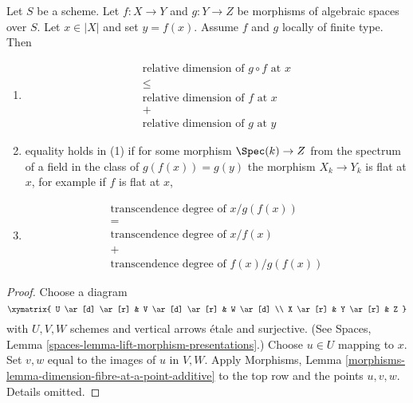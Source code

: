 \begin{lemma}
\label{lemma-dimension-fibre-at-a-point-additive}
Let $S$ be a scheme.
Let $f : X \to Y$ and $g : Y \to Z$ be morphisms of algebraic spaces over $S$.
Let $x \in |X|$ and set $y = f(x)$.
Assume $f$ and $g$ locally of finite type.
Then
\begin{enumerate}
\item
$$
\begin{matrix}
\text{relative dimension of }g \circ f\text{ at }x \\
\leq \\
\text{relative dimension of }f\text{ at }x \\
+ \\
\text{relative dimension of }g\text{ at }y
\end{matrix}
$$
\item equality holds in (1) if for some morphism $\Spec(k) \to Z$
from the spectrum of a field in the class of $g(f(x)) = g(y)$
the morphism $X_k \to Y_k$ is flat at $x$, for example if $f$ is flat at $x$,
\item
$$
\begin{matrix}
\text{transcendence degree of }x/g(f(x)) \\
= \\
\text{transcendence degree of }x/f(x) \\
+ \\
\text{transcendence degree of }f(x)/g(f(x))
\end{matrix}
$$
\end{enumerate}
\end{lemma}

\begin{proof}
Choose a diagram
$$
\xymatrix{
U \ar[d] \ar[r] & V \ar[d] \ar[r] & W \ar[d] \\
X \ar[r] & Y \ar[r] & Z
}
$$
with $U, V, W$ schemes and vertical arrows \'etale and surjective. (See
Spaces, Lemma \ref{spaces-lemma-lift-morphism-presentations}.)
Choose $u \in U$ mapping to $x$. Set $v, w$ equal to the images
of $u$ in $V, W$.
Apply
Morphisms, Lemma \ref{morphisms-lemma-dimension-fibre-at-a-point-additive}
to the top row and the points $u, v, w$. Details omitted.
\end{proof}


